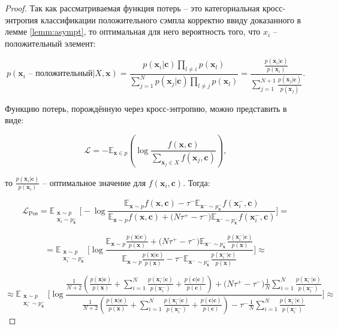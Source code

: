 \documentclass[a4paper, 14pt]{article}
\begin{document}
\begin{proof}
Так как рассматриваемая функция потерь -- это категориальная кросс-энтропия классификации положительного сэмпла корректно ввиду доказанного в лемме \ref{lemm:asympt}, то оптимальная для него вероятность того, что $x_i$ -- положительный элемент:

\[p(\mathbf{x}_i \text{ -- положительный} | X, \mathbf{x}) = \frac{p(\mathbf{x}_i|\mathbf{c})\prod_{l \neq i}p(\mathbf{x}_l)}{\sum_{j=1}^Np(\mathbf{x}_j|\mathbf{c})\prod_{l \neq j}p(\mathbf{x}_l)} = \frac{\frac{p(\mathbf{x}_i|\mathbf{c})}{p(\mathbf{x}_i)}}{\sum_{j=1}^{N+1}\frac{p(\mathbf{x}_j|\mathbf{c})}{p(\mathbf{x}_j)}}.\]

Функцию потерь, порождённую через кросс-энтропию, можно представить в виде:

\[\mathcal{L} = - \mathbb{E}_{\mathbf{x} \in p}\left(\log\frac{f(\mathbf{x}, \mathbf{c})}{\sum_{\mathbf{x}_j \in X}f(\mathbf{x}_j, \mathbf{c})}\right),\]

\noindent то $\frac{p(\mathbf{x}_i|\mathbf{c})}{p(\mathbf{x}_i)}$ -- оптимальное значение для $f(\mathbf{x}_i, \mathbf{c})$. Тогда:

\[\mathcal{L}_{\text{Pos}} = \mathbb{E}_{\substack{\mathbf{x} \sim p \\ \mathbf{x}_i \sim p_\mathbf{x}^-}} \bigg[ - \log \frac{\mathbb{E}_{\mathbf{x} \sim p}f(\mathbf{x}, \mathbf{c}) - \tau^- \mathbb{E}_{\mathbf{x}^- \sim p_\mathbf{x}^-} f(\mathbf{x}_i^-, \mathbf{c})}{\mathbb{E}_{\mathbf{x} \sim p} f(\mathbf{x}, \mathbf{c}) + \big(N \tau^+ - \tau^-\big) \mathbb{E}_{\mathbf{x}^- \sim p_\mathbf{x}^-} f(\mathbf{x}_i^-, \mathbf{c})}\bigg] =\]

\[= \mathbb{E}_{\substack{\mathbf{x} \sim p \\ \mathbf{x}_i^- \sim p_\mathbf{x}^-}} \bigg[\log \frac{\mathbb{E}_{\mathbf{x} \sim p}\frac{p(\mathbf{x}|\mathbf{c})}{p(\mathbf{x})} + \big(N \tau^+ - \tau^-\big) \mathbb{E}_{\mathbf{x}^- \sim p_\mathbf{x}^-}\frac{p(\mathbf{x}_i^-|\mathbf{c})}{p(\mathbf{x})}}{\mathbb{E}_{\mathbf{x} \sim p}\frac{p(\mathbf{x}|\mathbf{c})}{p(\mathbf{x})} - \tau^- \mathbb{E}_{\mathbf{x}^- \sim p_\mathbf{x}^-}\frac{p(\mathbf{x}_i^-|\mathbf{c})}{p(\mathbf{x})}}\bigg] \approx\]

\[\approx \mathbb{E}_{\substack{\mathbf{x} \sim p \\ \mathbf{x}_i^- \sim p_\mathbf{x}^-}} \bigg[\log \frac{\frac{1}{N + 2}\left(\frac{p(\mathbf{x}|\mathbf{c})}{p(\mathbf{x})} + \sum\limits_{i=1}^N\frac{p(\mathbf{x}_i^-|\mathbf{c})}{p(\mathbf{x}_i^-)} + \frac{p(\mathbf{c}|\mathbf{c})}{p(\mathbf{c})}\right) + \big(N \tau^+ - \tau^-\big)\frac{1}{N}\sum\limits_{i=1}^N\frac{p(\mathbf{x}_i^-|\mathbf{c})}{p(\mathbf{x}_i^-)}}{\frac{1}{N + 2}\left(\frac{p(\mathbf{x}|\mathbf{c})}{p(\mathbf{x})} + \sum\limits_{i=1}^N\frac{p(\mathbf{x}_i^-|\mathbf{c})}{p(\mathbf{x}_i^-)} + \frac{p(\mathbf{c}|\mathbf{c})}{p(\mathbf{c})}\right) - \tau^-\frac{1}{N}\sum\limits_{i=1}^N\frac{p(\mathbf{x}_i^-|\mathbf{c})}{p(\mathbf{x}_i^-)}}\bigg] \approx\]


\end{proof}
\end{document}
